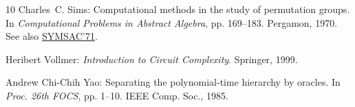 \documentclass[11pt]{article}
\numberwithin{equation}{section}
\theoremstyle{definition}
\theoremstyle{plain}
\begin{document}
\begin{thebibliography}{10}
{\sc Charles~C. Sims}: Computational methods in the study of permutation
  groups.
\newblock In {\em Computational Problems in Abstract Algebra}, pp. 169--183.
  Pergamon, 1970.
\newblock See also \href{https://doi.org/10.1145/800204.806264}{SYMSAC'71}.
\newblock [\epfmtdoi{10.1016/B978-0-08-012975-4.50020-5}]

{\sc Heribert Vollmer}: {\em Introduction to Circuit Complexity}.
\newblock Springer, 1999.
\newblock [\epfmtdoi{10.1007/978-3-662-03927-4}]

{\sc Andrew Chi-Chih Yao}: Separating the polynomial-time hierarchy by oracles.
\newblock In {\em Proc. 26th FOCS}, pp. 1--10. IEEE Comp. Soc., 1985.

\end{thebibliography}
\end{document}
